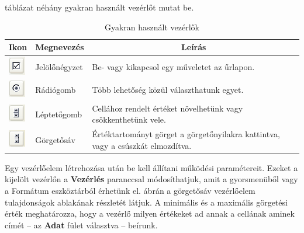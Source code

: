  táblázat néhány gyakran használt
vezérlőt mutat be.

\begin{table}[!h]
\begin{center}
\caption{Gyakran használt vezérlők}\label{GyakranHasználtVezérlők}
\begin{tabular}{|m{1cm}|m{2.7cm}|b{8cm}|}
\hline
\multicolumn{1}{|c|}{\textbf{Ikon}}&
\multicolumn{1}{c|}{\textbf{Megnevezés}}&
\multicolumn{1}{c|}{\textbf{Leírás}} \\
\hline
\centering \includegraphics[width=0.741cm]{oocalcv1-img147.png} &
Jelölőnégyzet & Be- vagy kikapcsol egy műveletet az űrlapon.\\ \hline
\centering \includegraphics[width=0.741cm]{oocalcv1-img148.png} &
Rádiógomb & Több lehetőség közül választhatunk egyet.\\ \hline
\centering \includegraphics[width=0.741cm]{oocalcv1-img149.png} &
Léptetőgomb & Cellához rendelt értéket növelhetünk vagy csökkenthetünk
vele.\\ \hline
\centering \includegraphics[width=0.741cm]{oocalcv1-img150.png} &
Görgetősáv & Értéktartományt görget a görgetőnyilakra kattintva, vagy a
csúszkát elmozdítva.\\ \hline
\end{tabular}
\end{center}
\end{table}

Egy vezérlőelem létrehozása után be kell állítani
működési paramétereit. Ezeket a kijelölt vezérlőn a
\textbf{Vezérlés }paranccsal módosíthatjuk, amit a
gyorsmenüből vagy a Formátum eszköztárból érhetünk
el.  ábrán a görgetősáv vezérlőelem
tulajdonságok ablakának részletét látjuk. A minimális és
a maximális görgetési érték meghatározza, hogy a
vezérlő milyen értékeket ad annak a cellának aminek
címét --  az \textbf{Adat} fület választva --  beírunk.

